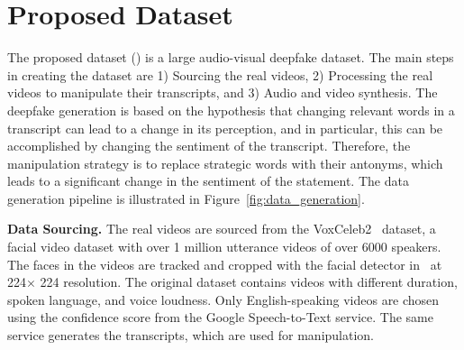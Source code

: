 \documentclass[conference, a4paper]{IEEEtran}
\begin{document}
\section{Proposed Dataset}
\label{sec:proposed_dataset}
The proposed dataset \dataset{} (\datasetabbr{}) is a large audio-visual deepfake dataset. The main steps in creating the dataset are 1) Sourcing the real videos, 2) Processing the real videos to manipulate their transcripts, and 3) Audio and video synthesis. The deepfake generation is based on the hypothesis that changing relevant words in a transcript can lead to a change in its perception, and in particular, this can be accomplished by changing the sentiment of the transcript. Therefore, the manipulation strategy is to replace strategic words with their antonyms, which leads to a significant change in the sentiment of the statement. The data generation pipeline is illustrated in Figure~\ref{fig:data_generation}.

\noindent \textbf{Data Sourcing.} The real videos are sourced from the VoxCeleb2~\cite{chung_voxceleb2_2018} dataset, a facial video dataset with over 1 million utterance videos of over 6000 speakers. The faces in the videos are tracked and cropped with the facial detector in~\cite{king_dlib-ml_2009} at 224$\times$ 224 resolution. The original dataset contains videos with different duration, spoken language, and voice loudness. Only English-speaking videos are chosen using the confidence score from the Google Speech-to-Text service. The same service generates the transcripts, which are used for manipulation.
\end{document}
